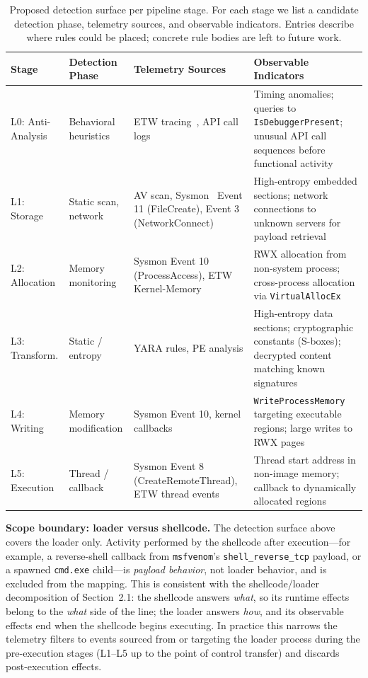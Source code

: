 \begin{table}[htbp]
    \centering
    \caption{Proposed detection surface per pipeline stage. For each stage we list a candidate detection phase, telemetry sources, and observable indicators. Entries describe where rules could be placed; concrete rule bodies are left to future work.}
    \label{tab:detection_surface}
    \small
    \begin{tabular}{@{}p{1.8cm}p{3.0cm}p{4.5cm}p{5.7cm}@{}}
        \toprule
        \textbf{Stage} & \textbf{Detection Phase} & \textbf{Telemetry Sources} & \textbf{Observable Indicators} \\
        \midrule
        L0: Anti-Analysis &
        Behavioral heuristics &
        ETW tracing~\cite{etw}, API call logs &
        Timing anomalies; queries to \texttt{IsDebuggerPresent}; unusual API call sequences before functional activity \\
        \midrule
        L1: Storage &
        Static scan, network &
        AV scan, Sysmon~\cite{sysmon} Event 11 (FileCreate), Event 3 (NetworkConnect) &
        High-entropy embedded sections; network connections to unknown servers for payload retrieval \\
        \midrule
        L2: Allocation &
        Memory monitoring &
        Sysmon Event 10 (ProcessAccess), ETW Kernel-Memory &
        RWX allocation from non-system process; cross-process allocation via \texttt{VirtualAllocEx} \\
        \midrule
        L3: Transform. &
        Static / entropy &
        YARA rules, PE analysis &
        High-entropy data sections; cryptographic constants (S-boxes); decrypted content matching known signatures \\
        \midrule
        L4: Writing &
        Memory modification &
        Sysmon Event 10, kernel callbacks &
        \texttt{WriteProcessMemory} targeting executable regions; large writes to RWX pages \\
        \midrule
        L5: Execution &
        Thread / callback &
        Sysmon Event 8 (CreateRemoteThread), ETW thread events &
        Thread start address in non-image memory; callback to dynamically allocated regions \\
        \bottomrule
    \end{tabular}
\end{table}

\textbf{Scope boundary: loader versus shellcode.}
The detection surface above covers the loader only.
Activity performed by the shellcode after execution---for example, a reverse-shell callback from \texttt{msfvenom}'s \texttt{shell\_reverse\_tcp} payload, or a spawned \texttt{cmd.exe} child---is \emph{payload behavior}, not loader behavior, and is excluded from the mapping.
This is consistent with the shellcode/loader decomposition of Section~2.1: the shellcode answers \emph{what}, so its runtime effects belong to the \emph{what} side of the line; the loader answers \emph{how}, and its observable effects end when the shellcode begins executing.
In practice this narrows the telemetry filters to events sourced from or targeting the loader process during the pre-execution stages (L1--L5 up to the point of control transfer) and discards post-execution effects.

